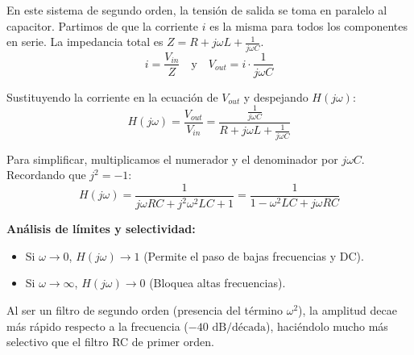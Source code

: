En este sistema de segundo orden, la tensión de salida se toma en paralelo al capacitor. Partimos de que la corriente \(i\) es la misma para todos los componentes en serie. La impedancia total es \(Z = R + j\omega L + \frac{1}{j\omega C}\).
\begin{equation}
  i = \frac{V_{in}}{Z} \quad \text{y} \quad V_{out} = i \cdot \frac{1}{j\omega C}
\end{equation}

Sustituyendo la corriente en la ecuación de \(V_{out}\) y despejando \(H(j\omega)\):
\begin{equation}
  H(j\omega) = \frac{V_{out}}{V_{in}} = \frac{\frac{1}{j\omega C}}{R + j\omega L + \frac{1}{j\omega C}}
\end{equation}

Para simplificar, multiplicamos el numerador y el denominador por \(j\omega C\). Recordando que \(j^2 = -1\):
\begin{equation}
  H(j\omega) = \frac{1}{j\omega R C + j^2\omega^2 LC + 1} = \frac{1}{1 - \omega^2 LC + j\omega RC}
\end{equation}

\textbf{Análisis de límites y selectividad:}
\begin{itemize}
  \item Si \(\omega \to 0\), \(H(j\omega) \to 1\) (Permite el paso de bajas frecuencias y DC).
  \item Si \(\omega \to \infty\), \(H(j\omega) \to 0\) (Bloquea altas frecuencias).
\end{itemize}
Al ser un filtro de segundo orden (presencia del término \(\omega^2\)), la amplitud decae más rápido respecto a la frecuencia (\(-40\text{ dB/década}\)), haciéndolo mucho más selectivo que el filtro RC de primer orden.
